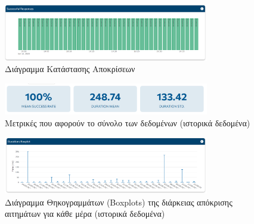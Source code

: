 \begin{figure}[!ht]
	\centering
	\includegraphics[width=0.8\textwidth]{./images/chapter5/succesfull_responses.png}
	\caption[Διάγραμμα Κατάστασης Αποκρίσεων]{Διάγραμμα Κατάστασης Αποκρίσεων}
	\label{fig:lychte_succesfull_responses}
\end{figure}

\begin{figure}[!ht]
	\centering
	\includegraphics[width=0.8\textwidth]{./images/chapter5/metrics.png}
	\caption[Μετρικές που αφορούν το σύνολο των δεδομένων (ιστορικά δεδομένα)]{Μετρικές που αφορούν το σύνολο των δεδομένων (ιστορικά δεδομένα)}
	\label{fig:lychte_metrics}
\end{figure}

\begin{figure}[!ht]
	\centering
	\includegraphics[width=0.8\textwidth]{./images/chapter5/duration_boxplot_diagram.png}
	\caption[Διάγραμμα Θηκογραμμάτων (Boxplots) της διάρκειας απόκρισης αιτημάτων για κάθε μέρα (ιστορικά δεδομένα)]{Διάγραμμα Θηκογραμμάτων (Boxplots) της διάρκειας απόκρισης αιτημάτων για κάθε μέρα (ιστορικά δεδομένα)}
	\label{fig:lychte_boxplot}
\end{figure}
